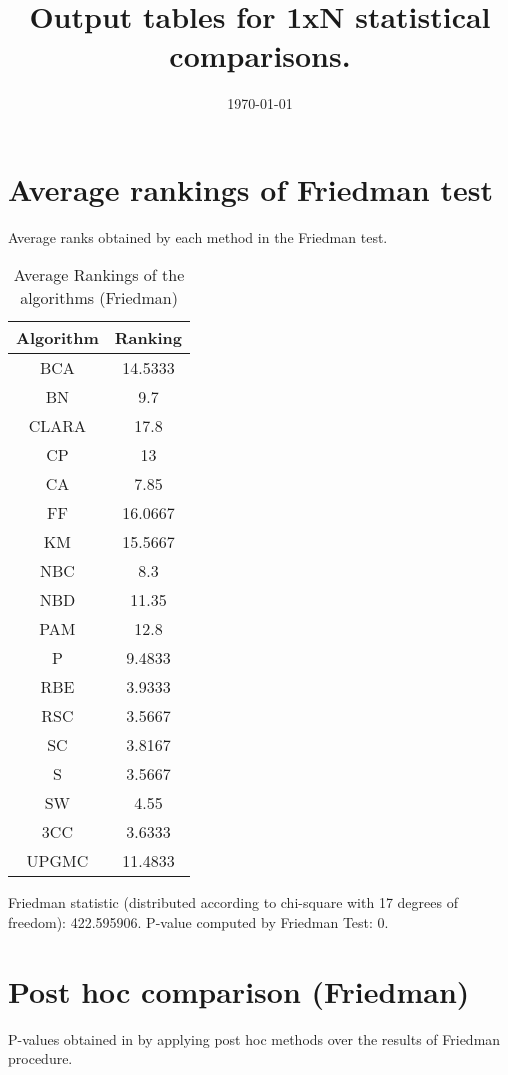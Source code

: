 \documentclass[a4paper,10pt]{article}
\title{Output tables for 1xN statistical comparisons.}
\author{}
\date{\today}
\begin{document}
\begin{landscape}
\pagestyle{empty}
\maketitle
\thispagestyle{empty}

\section{Average rankings of Friedman test}


Average ranks obtained by each method in the Friedman test.

\begin{table}[!htp]
\centering
\begin{tabular}{|c|c|}\hline
Algorithm&Ranking\\\hline
BCA&14.5333\\BN&9.7\\CLARA&17.8\\CP&13\\CA&7.85\\FF&16.0667\\KM&15.5667\\NBC&8.3\\NBD&11.35\\PAM&12.8\\P&9.4833\\RBE&3.9333\\RSC&3.5667\\SC&3.8167\\S&3.5667\\SW&4.55\\3CC&3.6333\\UPGMC&11.4833\\\hline\end{tabular}
\caption{Average Rankings of the algorithms (Friedman)}
\end{table}

Friedman statistic (distributed according to chi-square with 17 degrees of freedom): 422.595906. \newline P-value computed by Friedman Test: 0.\newline


\newpage

\section{Post hoc comparison (Friedman)}


P-values obtained in by applying post hoc methods over the results of Friedman procedure.


\end{landscape}
\end{document}
